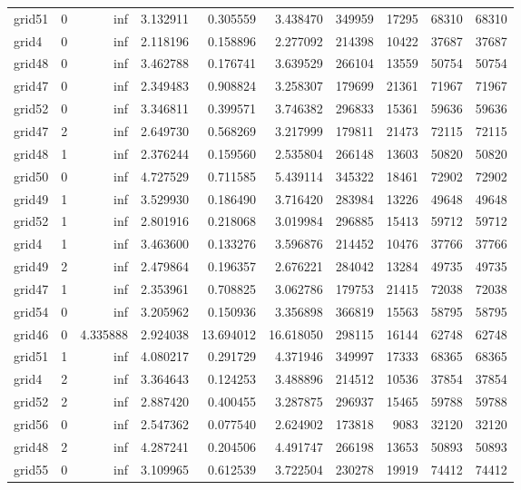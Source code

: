 \begin{longtable}{|l|r|r|r|r|r|r|r|r|r|}
grid51 & 0 & inf & 3.132911 & 0.305559 & 3.438470 & 349959 & 17295 & 68310 & 68310 \\
grid4 & 0 & inf & 2.118196 & 0.158896 & 2.277092 & 214398 & 10422 & 37687 & 37687 \\
grid48 & 0 & inf & 3.462788 & 0.176741 & 3.639529 & 266104 & 13559 & 50754 & 50754 \\
grid47 & 0 & inf & 2.349483 & 0.908824 & 3.258307 & 179699 & 21361 & 71967 & 71967 \\
grid52 & 0 & inf & 3.346811 & 0.399571 & 3.746382 & 296833 & 15361 & 59636 & 59636 \\
grid47 & 2 & inf & 2.649730 & 0.568269 & 3.217999 & 179811 & 21473 & 72115 & 72115 \\
grid48 & 1 & inf & 2.376244 & 0.159560 & 2.535804 & 266148 & 13603 & 50820 & 50820 \\
grid50 & 0 & inf & 4.727529 & 0.711585 & 5.439114 & 345322 & 18461 & 72902 & 72902 \\
grid49 & 1 & inf & 3.529930 & 0.186490 & 3.716420 & 283984 & 13226 & 49648 & 49648 \\
grid52 & 1 & inf & 2.801916 & 0.218068 & 3.019984 & 296885 & 15413 & 59712 & 59712 \\
grid4 & 1 & inf & 3.463600 & 0.133276 & 3.596876 & 214452 & 10476 & 37766 & 37766 \\
grid49 & 2 & inf & 2.479864 & 0.196357 & 2.676221 & 284042 & 13284 & 49735 & 49735 \\
grid47 & 1 & inf & 2.353961 & 0.708825 & 3.062786 & 179753 & 21415 & 72038 & 72038 \\
grid54 & 0 & inf & 3.205962 & 0.150936 & 3.356898 & 366819 & 15563 & 58795 & 58795 \\
grid46 & 0 & 4.335888 & 2.924038 & 13.694012 & 16.618050 & 298115 & 16144 & 62748 & 62748 \\
grid51 & 1 & inf & 4.080217 & 0.291729 & 4.371946 & 349997 & 17333 & 68365 & 68365 \\
grid4 & 2 & inf & 3.364643 & 0.124253 & 3.488896 & 214512 & 10536 & 37854 & 37854 \\
grid52 & 2 & inf & 2.887420 & 0.400455 & 3.287875 & 296937 & 15465 & 59788 & 59788 \\
grid56 & 0 & inf & 2.547362 & 0.077540 & 2.624902 & 173818 & 9083 & 32120 & 32120 \\
grid48 & 2 & inf & 4.287241 & 0.204506 & 4.491747 & 266198 & 13653 & 50893 & 50893 \\
grid55 & 0 & inf & 3.109965 & 0.612539 & 3.722504 & 230278 & 19919 & 74412 & 74412 \\

\end{longtable}
